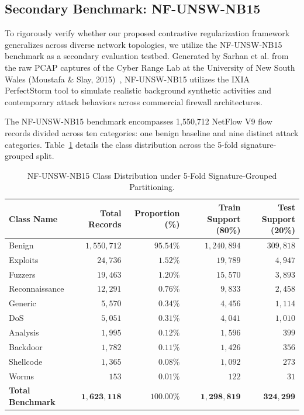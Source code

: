 \documentclass[12pt,a4paper]{report}
\begin{document}
\subsection{Secondary Benchmark: NF-UNSW-NB15}
To rigorously verify whether our proposed contrastive regularization framework generalizes across diverse network topologies, we utilize the NF-UNSW-NB15 benchmark as a secondary evaluation testbed. Generated by Sarhan et al. from the raw PCAP captures of the Cyber Range Lab at the University of New South Wales (Moustafa \& Slay, 2015)~\cite{moustafa2015unsw}, NF-UNSW-NB15 utilizes the IXIA PerfectStorm tool to simulate realistic background synthetic activities and contemporary attack behaviors across commercial firewall architectures.

The NF-UNSW-NB15 benchmark encompasses 1,550,712 NetFlow V9 flow records divided across ten categories: one benign baseline and nine distinct attack categories. Table~\ref{tab:unsw_distribution} details the class distribution across the 5-fold signature-grouped split.

\begin{table}[H]
\centering
\caption{NF-UNSW-NB15 Class Distribution under 5-Fold Signature-Grouped Partitioning.}
\label{tab:unsw_distribution}
\small
\begin{tabularx}{\textwidth}{Xrrrr}
\toprule
\textbf{Class Name} & \textbf{Total Records} & \textbf{Proportion (\%)} & \textbf{Train Support (80\%)} & \textbf{Test Support (20\%)} \\
\midrule
Benign & $1,550,712$ & $95.54\%$ & $1,240,894$ & $309,818$ \\
Exploits & $24,736$ & $1.52\%$ & $19,789$ & $4,947$ \\
Fuzzers & $19,463$ & $1.20\%$ & $15,570$ & $3,893$ \\
Reconnaissance & $12,291$ & $0.76\%$ & $9,833$ & $2,458$ \\
Generic & $5,570$ & $0.34\%$ & $4,456$ & $1,114$ \\
DoS & $5,051$ & $0.31\%$ & $4,041$ & $1,010$ \\
Analysis & $1,995$ & $0.12\%$ & $1,596$ & $399$ \\
Backdoor & $1,782$ & $0.11\%$ & $1,426$ & $356$ \\
Shellcode & $1,365$ & $0.08\%$ & $1,092$ & $273$ \\
Worms & $153$ & $0.01\%$ & $122$ & $31$ \\
\midrule
\textbf{Total Benchmark} & $\mathbf{1,623,118}$ & $\mathbf{100.00\%}$ & $\mathbf{1,298,819}$ & $\mathbf{324,299}$ \\
\bottomrule
\end{tabularx}
\end{table}
\end{document}
